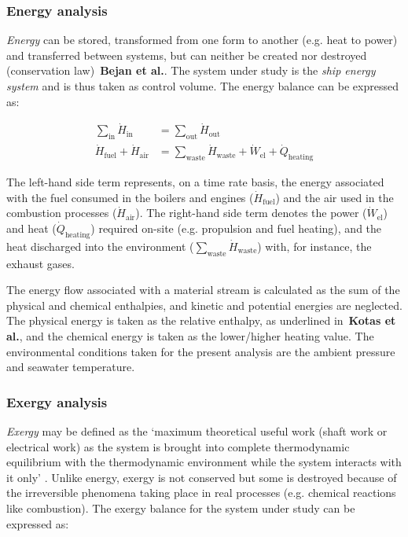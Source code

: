 \documentclass[preprint,12pt]{elsarticle}
\begin{document}
\subsubsection{Energy analysis}

\emph{Energy} can be stored, transformed from one form to another (e.g. heat to power) and transferred between systems, but can neither be created nor destroyed (conservation law)~\textbf{Bejan et al.}. The system under study is the \emph{ship energy system} and is thus taken as control volume. The energy balance can be expressed as:

\begin{align}
	\sum_{\mathrm{in}} \dot{H}_{\mathrm{in}} &= \sum_{\mathrm{out}} \dot{H}_{\mathrm{out}} \\
	\dot{H}_{\mathrm{fuel}} + \dot{H}_{\mathrm{air}} &= \sum_{{\mathrm{waste}}}\dot{H}_{{\mathrm{waste}}}+\dot{W}_{\mathrm{el}}+\dot{Q}_{\mathrm{heating}}
\end{align}

The left-hand side term represents, on a time rate basis, the energy associated with the fuel consumed in the boilers and engines ($\dot{H}_{\mathrm{fuel}}$) and the air used in the combustion processes ($\dot{H}_{\mathrm{air}}$). The right-hand side term denotes the power ($\dot{W}_{\mathrm{el}}$) and heat ($\dot{Q}_{\mathrm{heating}}$) required on-site (e.g. propulsion and fuel heating), and the heat discharged into the environment ($\sum_{{\mathrm{waste}}}\dot{H}_{{\mathrm{waste}}}$) with, for instance, the exhaust gases.

The energy flow associated with a material stream is calculated as the sum of the physical and chemical enthalpies, and kinetic and potential energies are neglected.    The physical energy is taken as the relative enthalpy, as underlined in~\textbf{Kotas et al.}, and the chemical energy is taken as the lower/higher heating value. The environmental conditions taken for the present analysis are the ambient pressure and seawater temperature.

\subsubsection{Exergy analysis}

\emph{Exergy} may be defined as the `maximum theoretical useful work (shaft work or electrical work) as the system is brought into complete thermodynamic equilibrium with the thermodynamic environment while the system interacts with it only' \cite{Tsatsaronis2007}. Unlike energy, exergy is not conserved but some is destroyed because of the irreversible phenomena taking place in real processes (e.g. chemical reactions like combustion). The exergy balance for the system under study can be expressed as:
\end{document}
